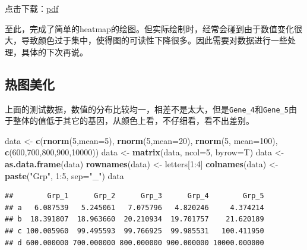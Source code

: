 \documentclass[]{article}
\newenvironment{Shaded}{\begin{snugshade}}{\end{snugshade}}
\newcommand{\KeywordTok}[1]{\textcolor[rgb]{0.13,0.29,0.53}{\textbf{{#1}}}}
\newcommand{\DataTypeTok}[1]{\textcolor[rgb]{0.13,0.29,0.53}{{#1}}}
\newcommand{\DecValTok}[1]{\textcolor[rgb]{0.00,0.00,0.81}{{#1}}}
\newcommand{\StringTok}[1]{\textcolor[rgb]{0.31,0.60,0.02}{{#1}}}
\newcommand{\NormalTok}[1]{{#1}}
\numberwithin{figure}{section}
\numberwithin{table}{section}
\theoremstyle{definition}
\theoremstyle{definition}
\theoremstyle{definition}
\theoremstyle{remark}
\begin{document}
点击下载：\href{heatmap.pdf}{pdf}

至此，完成了简单的heatmap的绘图。但实际绘制时，经常会碰到由于数值变化很大，导致颜色过于集中，使得图的可读性下降很多。因此需要对数据进行一些处理，具体的下次再说。

\subsection{热图美化}

上面的测试数据，数值的分布比较均一，相差不是太大，但是\texttt{Gene\_4}和\texttt{Gene\_5}由于整体的值低于其它的基因，从颜色上看，不仔细看，看不出差别。

\begin{Shaded}
\begin{Highlighting}[]
\NormalTok{data <-}\StringTok{ }\KeywordTok{c}\NormalTok{(}\KeywordTok{rnorm}\NormalTok{(}\DecValTok{5}\NormalTok{,}\DataTypeTok{mean=}\DecValTok{5}\NormalTok{), }\KeywordTok{rnorm}\NormalTok{(}\DecValTok{5}\NormalTok{,}\DataTypeTok{mean=}\DecValTok{20}\NormalTok{), }\KeywordTok{rnorm}\NormalTok{(}\DecValTok{5}\NormalTok{, }\DataTypeTok{mean=}\DecValTok{100}\NormalTok{), }\KeywordTok{c}\NormalTok{(}\DecValTok{600}\NormalTok{,}\DecValTok{700}\NormalTok{,}\DecValTok{800}\NormalTok{,}\DecValTok{900}\NormalTok{,}\DecValTok{10000}\NormalTok{))}
\NormalTok{data <-}\StringTok{ }\KeywordTok{matrix}\NormalTok{(data, }\DataTypeTok{ncol=}\DecValTok{5}\NormalTok{, }\DataTypeTok{byrow=}\NormalTok{T)}
\NormalTok{data <-}\StringTok{ }\KeywordTok{as.data.frame}\NormalTok{(data)}
\KeywordTok{rownames}\NormalTok{(data) <-}\StringTok{ }\NormalTok{letters[}\DecValTok{1}\NormalTok{:}\DecValTok{4}\NormalTok{]}
\KeywordTok{colnames}\NormalTok{(data) <-}\StringTok{ }\KeywordTok{paste}\NormalTok{(}\StringTok{"Grp"}\NormalTok{, }\DecValTok{1}\NormalTok{:}\DecValTok{5}\NormalTok{, }\DataTypeTok{sep=}\StringTok{"_"}\NormalTok{)}
\NormalTok{data}
\end{Highlighting}
\end{Shaded}

\begin{verbatim}
##        Grp_1      Grp_2      Grp_3      Grp_4        Grp_5
## a   6.087539   5.245061   7.075796   4.820246     4.374214
## b  18.391807  18.963660  20.210934  19.701757    21.620189
## c 100.005960  99.495593  99.766925  99.985531   100.411950
## d 600.000000 700.000000 800.000000 900.000000 10000.000000
\end{verbatim}

\begin{Shaded}
\end{Shaded}
\end{document}
